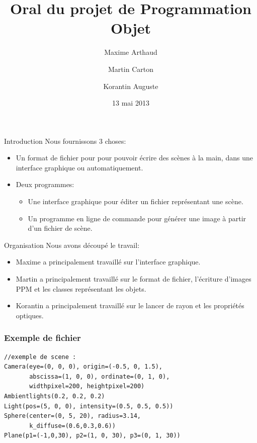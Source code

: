 \documentclass{beamer}
\title{Oral du projet de Programmation Objet}
\author{Maxime Arthaud \and Martin Carton \and Korantin Auguste}
\date{13 mai 2013}
\begin{document}
  \begin{frame}
    \titlepage
  \end{frame}

  \begin{frame}{Introduction}
    Nous fournissons 3 choses:
    \begin{itemize}
      \item Un format de fichier pour pour pouvoir écrire des scènes à la main,
        dans une interface graphique ou automatiquement.

      \item
        Deux programmes:
        \begin{itemize}
          \item Une interface graphique pour éditer un fichier représentant une
            scène.
          \item Un programme en ligne de commande pour générer une image à
            partir d'un fichier de scène.
        \end{itemize}
    \end{itemize}
  \end{frame}

  \begin{frame}{Organisation}
    Nous avons découpé le travail:
    \begin{itemize}
      \item Maxime a principalement travaillé sur l'interface graphique.
      \item Martin a principalement travaillé sur le format de fichier,
        l'écriture d'images PPM et les classes représentant les objets.
      \item Korantin a principalement travaillé sur le lancer de rayon et les
        propriétés optiques.
    \end{itemize}
  \end{frame}

\begin{frame}[fragile]
\frametitle{Exemple de fichier}

\begin{lstlisting}
//exemple de scene :
Camera(eye=(0, 0, 0), origin=(-0.5, 0, 1.5),
       abscissa=(1, 0, 0), ordinate=(0, 1, 0),
       widthpixel=200, heightpixel=200)
Ambientlights(0.2, 0.2, 0.2)
Light(pos=(5, 0, 0), intensity=(0.5, 0.5, 0.5))
Sphere(center=(0, 5, 20), radius=3.14,
       k_diffuse=(0.6,0.3,0.6))
Plane(p1=(-1,0,30), p2=(1, 0, 30), p3=(0, 1, 30))
\end{lstlisting}
\end{frame}
\end{document}

